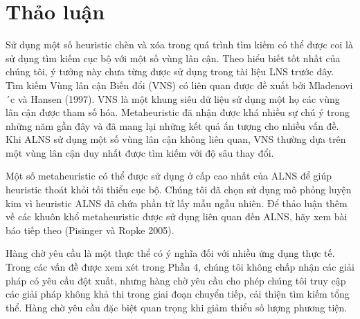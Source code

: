 \section{Thảo luận}
Sử dụng một số heuristic chèn và xóa trong quá trình tìm kiếm có thể được coi là sử dụng tìm kiếm cục bộ với một số vùng lân cận. Theo hiểu biết tốt nhất của chúng tôi, ý tưởng này chưa từng được sử dụng trong tài liệu LNS trước đây. Tìm kiếm Vùng lân cận Biến đổi (VNS) có liên quan được đề xuất bởi Mladenovi´c và Hansen (1997). VNS là một khung siêu dữ liệu sử dụng một họ các vùng lân cận được tham số hóa. Metaheuristic đã nhận được khá nhiều sự chú ý trong những năm gần đây và đã mang lại những kết quả ấn tượng cho nhiều vấn đề. Khi ALNS sử dụng một số vùng lân cận không liên quan, VNS thường dựa trên một vùng lân cận duy nhất được tìm kiếm với độ sâu thay đổi.

Một số metaheuristic có thể được sử dụng ở cấp cao nhất của ALNS để giúp heuristic thoát khỏi tối thiểu cục bộ. Chúng tôi đã chọn sử dụng mô phỏng luyện kim vì heuristic ALNS đã chứa phần tử lấy mẫu ngẫu nhiên. Để thảo luận thêm về các khuôn khổ metaheuristic được sử dụng liên quan đến ALNS, hãy xem bài báo tiếp theo (Pisinger và Ropke 2005).

Hàng chờ yêu cầu là một thực thể có ý nghĩa đối với nhiều ứng dụng thực tế. Trong các vấn đề được xem xét trong Phần 4, chúng tôi không chấp nhận các giải pháp có yêu cầu đột xuất, nhưng hàng chờ yêu cầu cho phép chúng tôi truy cập các giải pháp không khả thi trong giai đoạn chuyển tiếp, cải thiện tìm kiếm tổng thể. Hàng chờ yêu cầu đặc biệt quan trọng khi giảm thiểu số lượng phương tiện.
